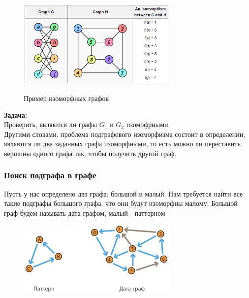             \begin{figure}[H]
                    \centering
                    \includegraphics[width=0.7\textwidth]{images/chapter11/isomorphism.png}
                    \label{fig:images/chapter11/isomorphism.png}
                    \caption{Пример изоморфных графов}
            \end{figure}
            
            \textbf{Задача:}\\
            Проверить, являются ли графы $G_1$ и $G_2$ изомофрными.\\
            
            Другими словами, проблема подграфового изоморфизма состоит в определении, являются ли два заданных графа изоморфными, то есть можно ли переставить вершины одного графа так, чтобы получить другой граф.
            
        \subsubsection{Поиск подграфа в графе}
            Пусть у нас определено два графа: большой и малый. Нам требуется найти все такие подграфы большого графа, что они будут изоморфны малому. Большой граф будем называть дата-графом, малый - паттерном

            \begin{figure}[H]
                    \centering
                    \includegraphics[width=0.7\textwidth]{images/chapter11/subgraph-1.png}
                    \label{fig:images/chapter11/subgraph-1.png}
            \end{figure}

